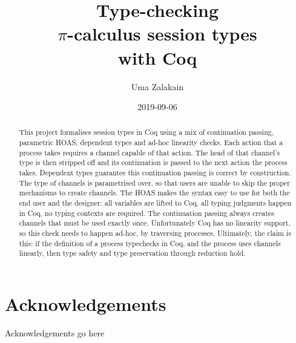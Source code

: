 \documentclass{mproj}
\begin{document}
\title{Type-checking\\ $\pi$-calculus session types\\ with Coq}
\author{Uma Zalakain}
\date{2019-09-06}
\maketitle

\begin{abstract}
    This project formalises session types in Coq using a mix of continuation
    passing, parametric HOAS, dependent types and ad-hoc linearity checks. Each
    action that a process takes requires a channel capable of that action. The
    head of that channel's type is then stripped off and its continuation is
    passed to the next action the process takes. Dependent types guarantee this
    continuation passing is correct by construction. The type of channels is
    parametrised over, so that users are unable to skip the proper mechanisms to
    create channels. The HOAS makes the syntax easy to use for both the end user
    and the designer: all variables are lifted to Coq, all typing judgments
    happen in Coq, no typing contexts are required. The continuation passing
    always creates channels that must be used exactly once. Unfortunately Coq
    has no linearity support, so this check needs to happen ad-hoc, by
    traversing processes. Ultimately, the claim is this: if the definition of a
    process typechecks in Coq, and the process uses channels linearly, then type
    safety and type preservation through reduction hold.
\end{abstract}

\educationalconsent
\vfill{}
\doclicenseThis
\newpage

\section*{Acknowledgements}

Acknowledgements go here

\tableofcontents
\end{document}
